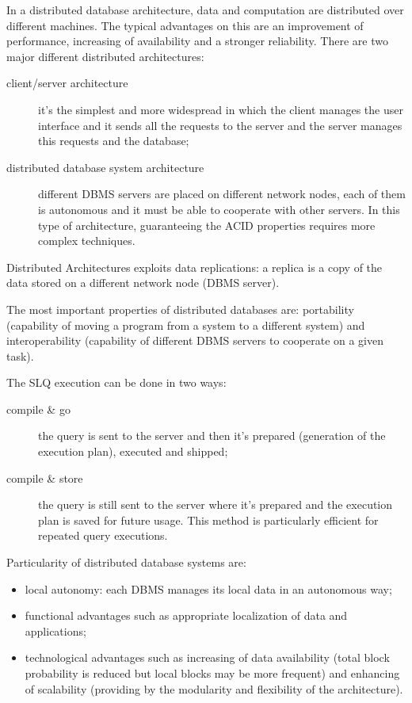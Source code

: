 In a distributed database architecture, data and computation are distributed over different machines.
The typical advantages on this are an improvement of performance, increasing of availability and a stronger reliability.
There are two major different distributed architectures:
\begin{description}
	\item[client/server architecture] it's the simplest and more widespread in which the client manages the user interface and it sends all the requests to the server and the server manages this requests and the database;
	\item[distributed database system architecture] different DBMS servers are placed on different network nodes, each of them is autonomous and it must be able to cooperate with other servers. In this type of architecture, guaranteeing the ACID properties requires more complex techniques.
\end{description}
Distributed Architectures exploits data replications: a replica is a copy of the data stored on a different network node (DBMS server).

The most important properties of distributed databases are: portability (capability of moving a program from a system to a different system) and interoperability (capability of different DBMS servers to cooperate on a given task).

The SLQ execution can be done in two ways:
\begin{description}
	\item[compile \& go] the query is sent to the server and then it's prepared (generation of the execution plan), executed and shipped;
	\item[compile \& store] the query is still sent to the server where it's prepared and the execution plan is saved for future usage.
	This method is particularly efficient for repeated query executions.
\end{description}

Particularity of distributed database systems are:
\begin{itemize}
	\item local autonomy: each DBMS manages its local data in an autonomous way;
	\item functional advantages such as appropriate localization of data and applications;
	\item technological advantages such as increasing of data availability (total block probability is reduced but local blocks may be more frequent) and enhancing of scalability (providing by the modularity and flexibility of the architecture).
\end{itemize}

